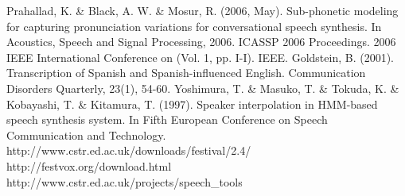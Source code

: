 \begin{thebibliography}{9}
 Prahallad, K. \& Black, A. W. \& Mosur, R. (2006, May). Sub-phonetic modeling for capturing pronunciation variations for conversational speech synthesis. In Acoustics, Speech and Signal Processing, 2006. ICASSP 2006 Proceedings. 2006 IEEE International Conference on (Vol. 1, pp. I-I). IEEE.
  Goldstein, B. (2001). Transcription of Spanish and Spanish-influenced English. Communication Disorders Quarterly, 23(1), 54-60.
 Yoshimura, T. \& Masuko, T. \& Tokuda, K. \& Kobayashi, T. \& Kitamura, T. (1997). Speaker interpolation in HMM-based speech synthesis system. In Fifth European Conference on Speech Communication and Technology.
 http://www.cstr.ed.ac.uk/downloads/festival/2.4/
 http://festvox.org/download.html
 http://www.cstr.ed.ac.uk/projects/speech\_tools
\end{thebibliography}
